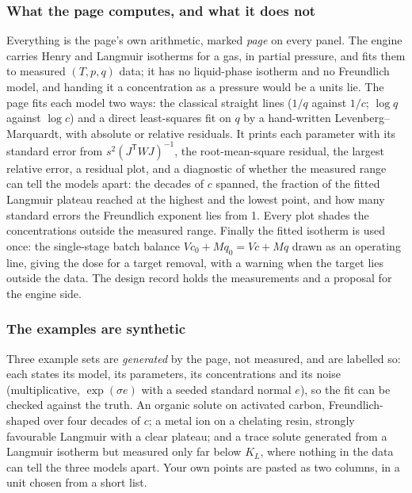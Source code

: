\documentclass[11pt,a4paper]{article}
\begin{document}
\subsubsection*{What the page computes, and what it does not}

Everything is the page's own arithmetic, marked \emph{page} on every panel.
The engine carries Henry and Langmuir isotherms for a gas, in partial
pressure, and fits them to measured $(T, p, q)$ data; it has no
liquid-phase isotherm and no Freundlich model, and handing it a
concentration as a pressure would be a units lie.  The page fits each model
two ways: the classical straight lines ($1/q$ against $1/c$; $\log q$
against $\log c$) and a direct least-squares fit on $q$ by a hand-written
Levenberg--Marquardt, with absolute or relative residuals.  It prints each
parameter with its standard error from $s^2(J^{\mathsf T}WJ)^{-1}$, the
root-mean-square residual, the largest relative error, a residual plot,
and a diagnostic of whether the measured range can tell the models apart:
the decades of $c$ spanned, the fraction of the fitted Langmuir plateau
reached at the highest and the lowest point, and how many standard errors
the Freundlich exponent lies from 1.  Every plot shades the concentrations
outside the measured range.  Finally the fitted isotherm is used once: the
single-stage batch balance $Vc_0 + Mq_0 = Vc + Mq$ drawn as an operating
line, giving the dose for a target removal, with a warning when the target
lies outside the data.  The design record
 holds the
measurements and a proposal for the engine side.

\subsubsection*{The examples are synthetic}

Three example sets are \emph{generated} by the page, not measured, and are
labelled so: each states its model, its parameters, its concentrations and
its noise (multiplicative, $\exp(\sigma e)$ with a seeded standard normal
$e$), so the fit can be checked against the truth.  An organic solute on
activated carbon, Freundlich-shaped over four decades of $c$; a metal ion on
a chelating resin, strongly favourable Langmuir with a clear plateau; and a
trace solute generated from a Langmuir isotherm but measured only far below
$K_L$, where nothing in the data can tell the three models apart.  Your own
points are pasted as two columns, in a unit chosen from a short list.
\end{document}
